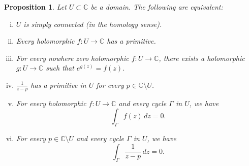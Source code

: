 \documentclass[12pt,openany]{book}
\newcommand{\C}{{\mathbb{C}}}
\theoremstyle{plain}
\newtheorem{prop}[thm]{Proposition}
\theoremstyle{remark}
\theoremstyle{definition}
\theoremstyle{exercise}
\theoremstyle{example}
\begin{document}
\begin{prop}
Let $U \subset \C$ be a domain.  The following are equivalent:
\begin{enumerate}[(i)]
\item \label{thm:simplyconnected:i}
$U$ is simply connected (in the homology sense).
\item \label{thm:simplyconnected:ii}
Every holomorphic $f \colon U \to \C$ has a primitive.
\item \label{thm:simplyconnected:iii}
For every nowhere zero holomorphic $f \colon U \to \C$, there exists
a holomorphic $g \colon U \to \C$ such that $e^{g(z)} = f(z)$.
\item \label{thm:simplyconnected:iv}
$\frac{1}{z-p}$ has a primitive in $U$ for every $p \in \C \setminus U$.
\item \label{thm:simplyconnected:v}
For every holomorphic $f \colon U \to \C$ and every
cycle $\Gamma$ in $U$, we have
\begin{equation*}
\int_\Gamma f(z) \, dz = 0 .
\end{equation*}
\item \label{thm:simplyconnected:vi}
For every $p \in \C \setminus U$ and every
cycle $\Gamma$ in $U$, we have
\begin{equation*}
\int_\Gamma \frac{1}{z-p} \, dz = 0 .
\end{equation*}
\end{enumerate}
\end{prop}
\end{document}
